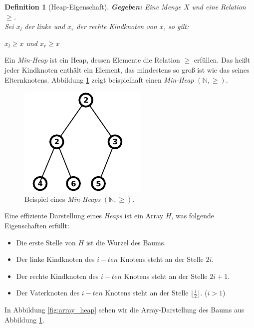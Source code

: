 \documentclass[a4paper,11pt]{scrartcl}%
\theoremstyle{change}
\theoremstyle{nonumberplain}
\theoremstyle{change}
\newtheorem{definition}[theorem]{Definition}
\theoremstyle{nonumberplain}
\theoremstyle{change}
\theoremstyle{nonumberplain}
\begin{document}
\begin{definition} [Heap-Eigenschaft]
	\textbf{Gegeben:} Eine Menge $X$ und eine Relation $\geq$.\\
	Sei $x_{l}$ der linke und $x_{r}$ der rechte Kindknoten von $x$, so gilt:\\
	\begin{center}{$x_{l} \geq x$ und $x_{r} \geq x$}\end{center}
	 
\end{definition}

Ein \textit{Min-Heap} ist ein Heap, dessen Elemente die Relation $\geq$ erfüllen. Das heißt jeder Kindknoten enthält ein Element, das mindestens so groß ist wie das seines Elternknotens. Abbildung \ref{fig:min_heap_example} zeigt beispielhaft einen \textit{Min-Heap} $(\mathbb{N}, \geq )$.

\begin{figure}[h]
	    \centering
		\includegraphics[scale=0.9]{./pics/min_heap_example}
		 \caption{Beispiel eines \textit{Min-Heaps} $(\mathbb{N}, \geq )$.}
		 \label{fig:min_heap_example}
\end{figure}

Eine effiziente Darstellung eines \textit{Heaps} ist ein Array $H$, was folgende Eigenschaften erfüllt:

\begin{itemize}
	\item Die erste Stelle von $H$ ist die Wurzel des Baums. \label{heap_array_prop_1}
	\item Der linke Kindknoten des $i-ten$ Knotens steht an der Stelle $2i$.
	\item Der rechte Kindknoten des $i-ten$ Knotens steht an der Stelle $2i + 1$.
	\item Der Vaterknoten des $i-ten$ Knotens steht an der Stelle $\lfloor\frac{i}{2}\rfloor$. ($i>1$)
\end{itemize}
	
In Abbildung \ref{fig:array_heap} sehen wir die Array-Darstellung des Baums aus Abbildung \ref{fig:min_heap_example}.
\end{document}

